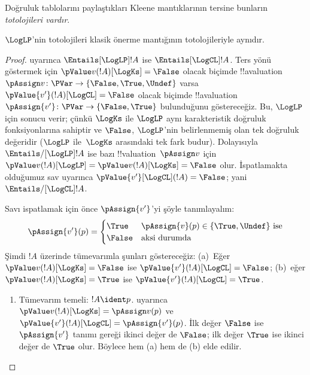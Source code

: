 \documentclass[../../../include/open-logic-section]{subfiles}
\begin{document}
Doğruluk tablolarını paylaştıkları Kleene mantıklarının tersine bunların
\emph{totolojileri vardır}.

\begin{prop} $\LogLP$'nin totolojileri klasik
  önerme mantığının totolojileriyle aynıdır.
\end{prop}

\begin{proof}
   uyarınca $\Entails[\LogLP] !A$ ise
  $\Entails[\LogCL] !A$. Ters yönü göstermek için
  $\pValue v(!A)[\LogKs] = \False$ olacak biçimde
  !!a{valuation}~$\pAssign v\colon \PVar \to \{\False, \True,
  \Undef\}$ varsa $\pValue {v'}(!A)[\LogCL] = \False$ olacak biçimde
  !!a{valuation}~$\pAssign {v'}\colon \PVar \to \{\False, \True\}$
  bulunduğunu göstereceğiz. Bu, $\LogLP$ için sonucu verir; çünkü $\LogKs$
  ile $\LogLP$ aynı karakteristik doğruluk fonksiyonlarına sahiptir ve
  $\False$, $\LogLP$'nin belirlenmemiş olan tek doğruluk değeridir
  ($\LogLP$ ile~$\LogKs$ arasındaki tek fark budur). Dolayısıyla
  $\Entails/[\LogLP] !A$ ise bazı !!{valuation}~$\pAssign v$ için
  $\pValue v(!A)[\LogLP] = \pValue v(!A)[\LogKs] = \False$ olur.
  İspatlamakta olduğumuz sav uyarınca
  $\pValue{v'}[\LogCL](!A) = \False$; yani
  $\Entails/[\LogCL] !A$.
  
  Savı ispatlamak için önce $\pAssign {v'}$'yi şöyle tanımlayalım:
  \[
    \pAssign {v'}(p) = 
    \begin{cases}
    \True & \text{$\pAssign {v}(p) \in \{\True, \Undef\}$ ise}\\
    \False & \text{aksi durumda}
  \end{cases}
  \]
  Şimdi $!A$ üzerinde tümevarımla şunları göstereceğiz: (a)~Eğer
  $\pValue v(!A)[\LogKs] = \False$ ise
  $\pValue {v'}(!A)[\LogCL] = \False$; (b)~eğer
  $\pValue v(!A)[\LogKs] = \True$ ise
  $\pValue {v'}(!A)[\LogCL] = \True$.
  \begin{enumerate}
    \item Tümevarım temeli: $!A \ident p$.
     uyarınca
    $\pValue v(!A)[\LogKs] = \pAssign v(p)$ ve
    $\pValue {v'}(!A)[\LogCL] = \pAssign {v'}(p)$. İlk değer $\False$ ise
    $\pAssign {v'}$ tanımı gereği ikinci değer de $\False$; ilk değer
    $\True$ ise ikinci değer de $\True$ olur. Böylece hem (a) hem de (b)
    elde edilir.
    

\end{enumerate}
\end{proof}
\end{document}

